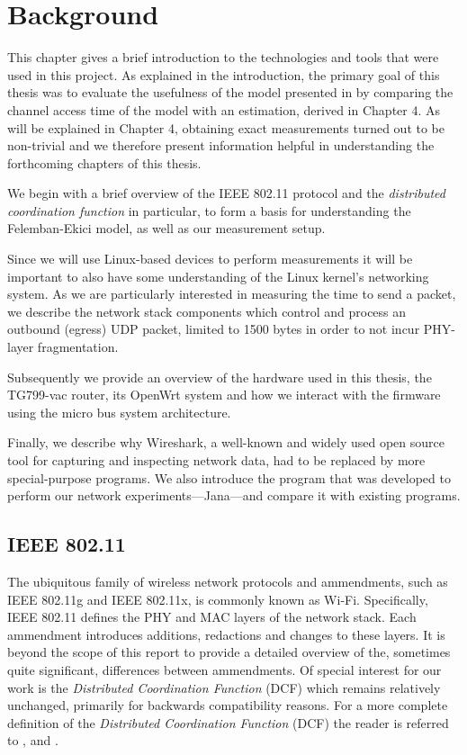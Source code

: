 
\chapter{Background}

This chapter gives a brief introduction to the technologies and tools that were
used in this project. As explained in the introduction, the primary goal of
this thesis was to evaluate the usefulness of the model presented in
\cite{felemban} by comparing the channel access time of the model with an
estimation, derived in Chapter 4. As will be explained in Chapter 4, obtaining
exact measurements turned out to be non-trivial and we therefore present
information helpful in understanding the forthcoming chapters of this thesis.

We begin with a brief overview of the IEEE 802.11 protocol and the
\emph{distributed coordination function} in particular, to form a basis for
understanding the Felemban-Ekici model, as well as our measurement setup.

Since we will use Linux-based devices to perform measurements it will be
important to also have some understanding of the Linux kernel's networking
system. As we are particularly interested in measuring the time to send a
packet, we describe the network stack components which control and process an
outbound (egress) UDP packet, limited to 1500 bytes in order to not incur
PHY-layer fragmentation.

Subsequently we provide an overview of the hardware used in this thesis, the
TG799-vac router, its OpenWrt system and how we interact with the firmware
using the micro bus system architecture.

Finally, we describe why Wireshark, a well-known and widely used open source
tool for capturing and inspecting network data, had to be replaced by more
special-purpose programs. We also introduce the program that was developed to
perform our network experiments—Jana—and compare it with existing programs.

\section{IEEE 802.11}

The ubiquitous family of wireless network protocols and ammendments, such as
IEEE 802.11g and IEEE 802.11x, is commonly known as Wi-Fi. Specifically, IEEE
802.11 defines the PHY and MAC layers of the network stack. Each ammendment
introduces additions, redactions and changes to these layers. It is beyond the
scope of this report to provide a detailed overview of the, sometimes quite
significant, differences between ammendments. Of special interest for our work
is the \emph{Distributed Coordination Function} (DCF) which remains relatively
unchanged, primarily for backwards compatibility reasons. For a more complete
definition of the \emph{Distributed Coordination Function} (DCF) the reader is
referred to \cite{654749}, \cite{5307322} and \cite{6687187}.

